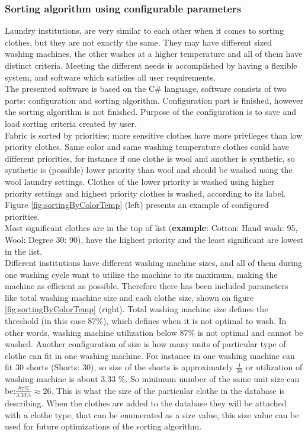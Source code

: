 \subsubsection{Sorting algorithm using configurable parameters}

Laundry institutions, are very similar to each other when it comes to sorting clothes, but they are not exactly the same. They may have different sized washing machines, the other washes at a higher temperature and all of them have distinct criteria. Meeting the different needs is accomplished by having a flexible system, and software which satisfies all user requirements. \\  The presented software is based on the C\# language, software consists of two parts: configuration and sorting algorithm. Configuration part is finished, however the sorting algorithm is not finished. Purpose of the configuration is to save and load sorting criteria created by user. 
\\
Fabric is sorted by priorities; more sensitive clothes have more privileges than low priority clothes. Same color and same washing temperature clothes could have different priorities, for instance if one clothe is wool and another is synthetic, so synthetic is (possible) lower priority than wool and should be washed using the wool laundry settings. Clothes of the lower priority is washed using higher priority settings and highest priority clothes is washed, according to its label. Figure \ref{fig:sortingByColorTemp} (left) presents an example of configured priorities. \\ Most significant clothes are in the top of list (\textbf{example}: Cotton: Hand wash: 95, Wool: Degree 30: 90),  have the highest priority and the least significant are lowest in the list. 
\\
Different institutions have different washing machine sizes, and all of them during one washing cycle want to utilize the machine to its maximum, making the machine as efficient as possible. Therefore there has been included parameters like total washing machine size and each clothe size, shown on figure \ref{fig:sortingByColorTemp} (right). Total washing machine size defines the threshold (in this case 87\%), which defines when it is not optimal to wash. In other words, washing machine utilization below 87\% is not optimal and cannot be washed. Another configuration of size is how many units of particular type of clothe can fit in one washing machine. For instance in one washing machine can fit 30 shorts (Shorts: 30), so size of the shorts is approximately $\frac{1}{30}$ or utilization of washing machine is about 3.33 \%. So minimum number of the same unit size can be:$\frac{87\%}{3.33\%}\approx 26$. This is what the size of the particular clothe in the database is describing. When the clothes are added to the database they will be attached with a clothe type, that can be enumerated as a size value, this size value can be used for future optimizations of the sorting algorithm.  \\ 

